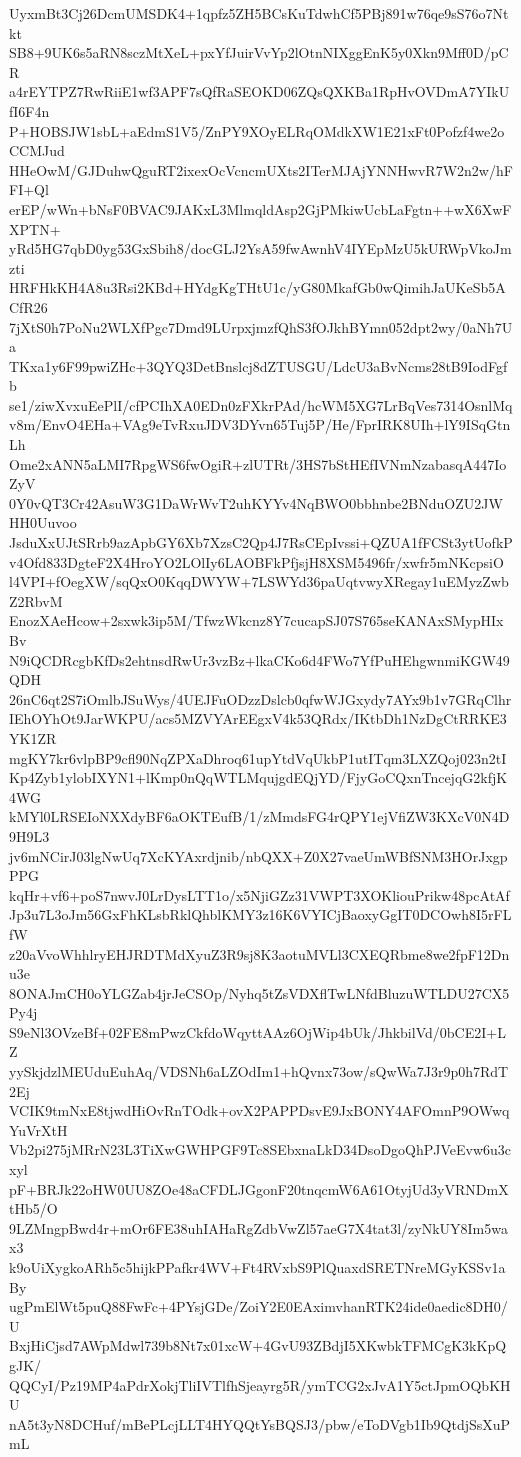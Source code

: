 UyxmBt3Cj26DcmUMSDK4+1qpfz5ZH5BCsKuTdwhCf5PBj891w76qe9sS76o7Ntkt
SB8+9UK6s5aRN8sczMtXeL+pxYfJuirVvYp2lOtnNIXggEnK5y0Xkn9Mff0D/pCR
a4rEYTPZ7RwRiiE1wf3APF7sQfRaSEOKD06ZQsQXKBa1RpHvOVDmA7YIkUfI6F4n
P+HOBSJW1sbL+aEdmS1V5/ZnPY9XOyELRqOMdkXW1E21xFt0Pofzf4we2oCCMJud
HHeOwM/GJDuhwQguRT2ixexOcVcncmUXts2ITerMJAjYNNHwvR7W2n2w/hFFI+Ql
erEP/wWn+bNsF0BVAC9JAKxL3MlmqldAsp2GjPMkiwUcbLaFgtn++wX6XwFXPTN+
yRd5HG7qbD0yg53GxSbih8/docGLJ2YsA59fwAwnhV4IYEpMzU5kURWpVkoJmzti
HRFHkKH4A8u3Rsi2KBd+HYdgKgTHtU1c/yG80MkafGb0wQimihJaUKeSb5ACfR26
7jXtS0h7PoNu2WLXfPgc7Dmd9LUrpxjmzfQhS3fOJkhBYmn052dpt2wy/0aNh7Ua
TKxa1y6F99pwiZHc+3QYQ3DetBnslcj8dZTUSGU/LdcU3aBvNcms28tB9IodFgfb
se1/ziwXvxuEePlI/cfPCIhXA0EDn0zFXkrPAd/hcWM5XG7LrBqVes7314OsnlMq
v8m/EnvO4EHa+VAg9eTvRxuJDV3DYvn65Tuj5P/He/FprIRK8UIh+lY9ISqGtnLh
Ome2xANN5aLMI7RpgWS6fwOgiR+zlUTRt/3HS7bStHEfIVNmNzabasqA447IoZyV
0Y0vQT3Cr42AsuW3G1DaWrWvT2uhKYYv4NqBWO0bbhnbe2BNduOZU2JWHH0Uuvoo
JsduXxUJtSRrb9azApbGY6Xb7XzsC2Qp4J7RsCEpIvssi+QZUA1fFCSt3ytUofkP
v4Ofd833DgteF2X4HroYO2LOlIy6LAOBFkPfjsjH8XSM5496fr/xwfr5mNKcpsiO
l4VPI+fOegXW/sqQxO0KqqDWYW+7LSWYd36paUqtvwyXRegay1uEMyzZwbZ2RbvM
EnozXAeHcow+2sxwk3ip5M/TfwzWkcnz8Y7cucapSJ07S765seKANAxSMypHIxBv
N9iQCDRcgbKfDs2ehtnsdRwUr3vzBz+lkaCKo6d4FWo7YfPuHEhgwnmiKGW49QDH
26nC6qt2S7iOmlbJSuWys/4UEJFuODzzDslcb0qfwWJGxydy7AYx9b1v7GRqClhr
IEhOYhOt9JarWKPU/acs5MZVYArEEgxV4k53QRdx/IKtbDh1NzDgCtRRKE3YK1ZR
mgKY7kr6vlpBP9cfl90NqZPXaDhroq61upYtdVqUkbP1utITqm3LXZQoj023n2tI
Kp4Zyb1ylobIXYN1+lKmp0nQqWTLMqujgdEQjYD/FjyGoCQxnTncejqG2kfjK4WG
kMYl0LRSEIoNXXdyBF6aOKTEufB/1/zMmdsFG4rQPY1ejVfiZW3KXcV0N4D9H9L3
jv6mNCirJ03lgNwUq7XcKYAxrdjnib/nbQXX+Z0X27vaeUmWBfSNM3HOrJxgpPPG
kqHr+vf6+poS7nwvJ0LrDysLTT1o/x5NjiGZz31VWPT3XOKliouPrikw48pcAtAf
Jp3u7L3oJm56GxFhKLsbRklQhblKMY3z16K6VYICjBaoxyGgIT0DCOwh8I5rFLfW
z20aVvoWhhlryEHJRDTMdXyuZ3R9sj8K3aotuMVLl3CXEQRbme8we2fpF12Dnu3e
8ONAJmCH0oYLGZab4jrJeCSOp/Nyhq5tZsVDXflTwLNfdBluzuWTLDU27CX5Py4j
S9eNl3OVzeBf+02FE8mPwzCkfdoWqyttAAz6OjWip4bUk/JhkbilVd/0bCE2I+LZ
yySkjdzlMEUduEuhAq/VDSNh6aLZOdIm1+hQvnx73ow/sQwWa7J3r9p0h7RdT2Ej
VCIK9tmNxE8tjwdHiOvRnTOdk+ovX2PAPPDsvE9JxBONY4AFOmnP9OWwqYuVrXtH
Vb2pi275jMRrN23L3TiXwGWHPGF9Tc8SEbxnaLkD34DsoDgoQhPJVeEvw6u3cxyl
pF+BRJk22oHW0UU8ZOe48aCFDLJGgonF20tnqcmW6A61OtyjUd3yVRNDmXtHb5/O
9LZMngpBwd4r+mOr6FE38uhIAHaRgZdbVwZl57aeG7X4tat3l/zyNkUY8Im5wax3
k9oUiXygkoARh5c5hijkPPafkr4WV+Ft4RVxbS9PlQuaxdSRETNreMGyKSSv1aBy
ugPmElWt5puQ88FwFc+4PYsjGDe/ZoiY2E0EAximvhanRTK24ide0aedic8DH0/U
BxjHiCjsd7AWpMdwl739b8Nt7x01xcW+4GvU93ZBdjI5XKwbkTFMCgK3kKpQgJK/
QQCyI/Pz19MP4aPdrXokjTliIVTlfhSjeayrg5R/ymTCG2xJvA1Y5ctJpmOQbKHU
nA5t3yN8DCHuf/mBePLcjLLT4HYQQtYsBQSJ3/pbw/eToDVgb1Ib9QtdjSsXuPmL
